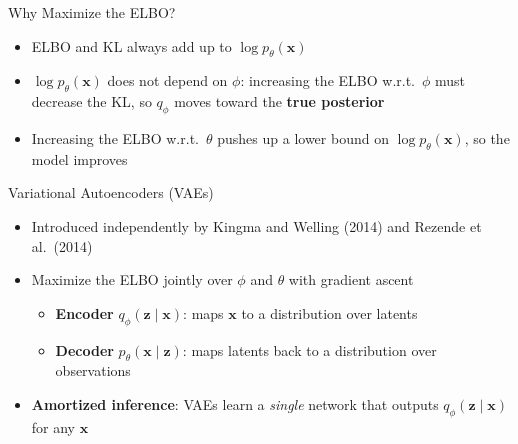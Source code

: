 \documentclass[11pt,compress,t,notes=noshow, xcolor=table]{beamer}
\providecommand{\bx}{\mathbf{x}}
\providecommand{\bz}{\mathbf{z}}
\begin{document}
\begin{frame}{Why Maximize the ELBO?}
\begin{itemize}
\item ELBO and KL always add up to $\log p_\theta(\bx)$
\item<2-> $\log p_\theta(\bx)$ does not depend on $\phi$: increasing the ELBO w.r.t.\ $\phi$ must decrease the KL, so $q_\phi$ moves toward the \textbf{true posterior}
\item<3-> Increasing the ELBO w.r.t.\ $\theta$ pushes up a lower bound on $\log p_\theta(\bx)$, so the model improves
\end{itemize}

\vfill

\end{frame}



\begin{frame}{Variational Autoencoders (VAEs)}

\vfill

\begin{itemize}
\item Introduced independently by Kingma and Welling (2014)  and Rezende et al.\ (2014) 
\item Maximize the ELBO jointly over $\phi$ and $\theta$ with gradient ascent
\begin{itemize}
\item \textbf{Encoder} $q_\phi(\bz \mid \bx)$: maps $\bx$ to a distribution over latents
\item \textbf{Decoder} $p_\theta(\bx \mid \bz)$: maps latents back to a distribution over observations
\end{itemize}
\item \textbf{Amortized inference}: VAEs learn a \emph{single} network that outputs $q_\phi(\bz \mid \bx)$ for any $\bx$
\end{itemize}

\vfill

\centering
{}

\vfill

\end{frame}
\end{document}
